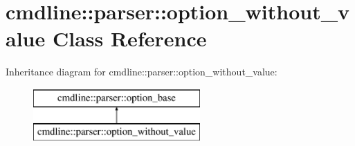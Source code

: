 \hypertarget{classcmdline_1_1parser_1_1option__without__value}{}\section{cmdline\+::parser\+::option\+\_\+without\+\_\+value Class Reference}
\label{classcmdline_1_1parser_1_1option__without__value}
Inheritance diagram for cmdline\+::parser\+::option\+\_\+without\+\_\+value\+:\begin{figure}[H]
\begin{center}
\leavevmode
\includegraphics[height=2.000000cm]{classcmdline_1_1parser_1_1option__without__value}
\end{center}
\end{figure}
